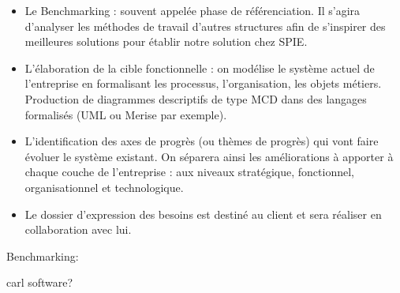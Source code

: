 \begin{itemize}
\item Le Benchmarking : souvent appelée phase de référenciation. Il s’agira d’analyser les méthodes de travail d’autres structures afin de s’inspirer des meilleures solutions pour établir notre solution chez SPIE.
\item L’élaboration de la cible fonctionnelle : on modélise le système actuel de l’entreprise en formalisant les processus, l’organisation, les objets métiers. Production de diagrammes descriptifs de type MCD dans des langages formalisés (UML ou Merise par exemple).
\item L’identification des axes de progrès (ou thèmes de progrès) qui vont faire évoluer le système existant. On séparera ainsi les améliorations à apporter à chaque couche de l’entreprise : aux niveaux stratégique, fonctionnel, organisationnel et technologique.
\item Le dossier d’expression des besoins est destiné au client et sera réaliser en collaboration avec lui.
\end{itemize}


Benchmarking:

carl software?
